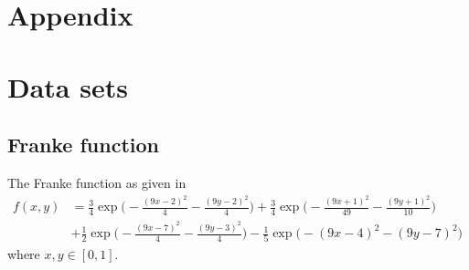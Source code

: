 \documentclass[a4paper]{article}
\begin{document}
\section*{Appendix} \label{chap:appendix}
\section{Data sets} \label{app:datasets}
\subsection{Franke function} \label{app:Franke}
The Franke function as given in \cite{Franke}
\begin{align*}
	f(x,y) &= \frac{3}{4}\exp\bigg(-\frac{(9x-2)^2}{4} - \frac{(9y-2)^2}{4}\bigg)
	+\frac{3}{4}\exp\bigg(-\frac{(9x+1)^2}{49} - \frac{(9y+1)^2}{10}\bigg)\\
	&+\frac{1}{2}\exp\bigg(-\frac{(9x-7)^2}{4} - \frac{(9y-3)^2}{4}\bigg)
	-\frac{1}{5}\exp\big(-(9x-4)^2 - (9y-7)^2\big)
\end{align*}
where $x,y \in [0, 1]$.
\end{document}
